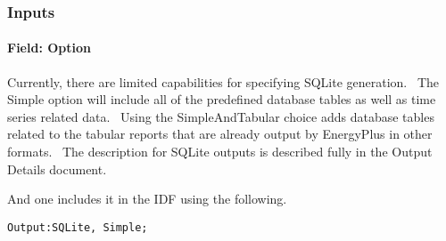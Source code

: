 \subsubsection{Inputs}\label{inputs-12-014}

\paragraph{Field: Option}\label{field-option}

Currently, there are limited capabilities for specifying SQLite generation.~ The Simple option will include all of the predefined database tables as well as time series related data.~ Using the SimpleAndTabular choice adds database tables related to the tabular reports that are already output by EnergyPlus in other formats.~ The description for SQLite outputs is described fully in the Output Details document.

And one includes it in the IDF using the following.

\begin{lstlisting}
Output:SQLite, Simple;
\end{lstlisting}